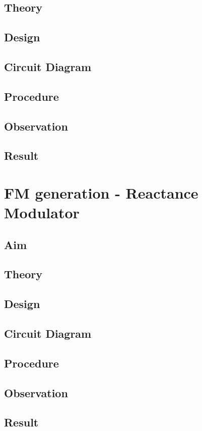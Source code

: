 \documentclass{book}
\begin{document}
\section*{Theory}
\section*{Design}
\section*{Circuit Diagram}
\section*{Procedure}
\section*{Observation}
\section*{Result}


\chapter[FM generation - Reactance Modulator]{FM generation - Reactance Modulator}
\section*{Aim}
\section*{Theory}
\section*{Design}
\section*{Circuit Diagram}
\section*{Procedure}
\section*{Observation}
\section*{Result}
\end{document}
